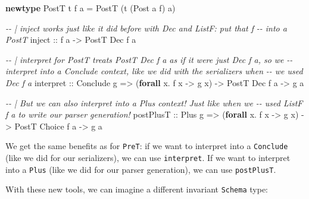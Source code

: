 \documentclass[]{article}
\newenvironment{Shaded}{}{}
\newcommand{\CommentTok}[1]{\textcolor[rgb]{0.38,0.63,0.69}{\textit{#1}}}
\newcommand{\DataTypeTok}[1]{\textcolor[rgb]{0.56,0.13,0.00}{#1}}
\newcommand{\KeywordTok}[1]{\textcolor[rgb]{0.00,0.44,0.13}{\textbf{#1}}}
\newcommand{\NormalTok}[1]{#1}
\newcommand{\OperatorTok}[1]{\textcolor[rgb]{0.40,0.40,0.40}{#1}}
\newcommand{\OtherTok}[1]{\textcolor[rgb]{0.00,0.44,0.13}{#1}}
\begin{document}
\begin{Shaded}
\begin{Highlighting}[]
\KeywordTok{newtype} \DataTypeTok{PostT}\NormalTok{ t f a }\OtherTok{=} \DataTypeTok{PostT}\NormalTok{ (t (}\DataTypeTok{Post}\NormalTok{ a f) a)}

\CommentTok{{-}{-} | \textasciigrave{}inject\textasciigrave{} works just like it did before with \textasciigrave{}Dec\textasciigrave{} and \textasciigrave{}ListF\textasciigrave{}: put that \textasciigrave{}f\textasciigrave{}}
\CommentTok{{-}{-} into a \textasciigrave{}PostT\textasciigrave{}}
\OtherTok{inject ::}\NormalTok{ f a }\OtherTok{{-}>} \DataTypeTok{PostT} \DataTypeTok{Dec}\NormalTok{ f a}

\CommentTok{{-}{-} | interpret for PostT treats \textasciigrave{}PostT Dec f a\textasciigrave{} as if it were just \textasciigrave{}Dec f a\textasciigrave{}, so we}
\CommentTok{{-}{-} interpret into a \textasciigrave{}Conclude\textasciigrave{} context, like we did with the serializers when}
\CommentTok{{-}{-} we used \textasciigrave{}Dec f a\textasciigrave{}}
\NormalTok{interpret}
\OtherTok{    ::} \DataTypeTok{Conclude}\NormalTok{ g}
    \OtherTok{=>}\NormalTok{ (}\KeywordTok{forall}\NormalTok{ x}\OperatorTok{.}\NormalTok{ f x }\OtherTok{{-}>}\NormalTok{ g x)}
    \OtherTok{{-}>} \DataTypeTok{PostT} \DataTypeTok{Dec}\NormalTok{ f a}
    \OtherTok{{-}>}\NormalTok{ g a}

\CommentTok{{-}{-} | But we can also interpret into a \textasciigrave{}Plus\textasciigrave{} context!  Just like when we}
\CommentTok{{-}{-} used \textasciigrave{}ListF f a\textasciigrave{} to write our parser generation!}
\NormalTok{postPlusT}
\OtherTok{    ::} \DataTypeTok{Plus}\NormalTok{ g}
    \OtherTok{=>}\NormalTok{ (}\KeywordTok{forall}\NormalTok{ x}\OperatorTok{.}\NormalTok{ f x }\OtherTok{{-}>}\NormalTok{ g x)}
    \OtherTok{{-}>} \DataTypeTok{PostT} \DataTypeTok{Choice}\NormalTok{ f a}
    \OtherTok{{-}>}\NormalTok{ g a}
\end{Highlighting}
\end{Shaded}

We get the same benefits as for \texttt{PreT}: if we want to interpret into a
\texttt{Conclude} (like we did for our serializers), we can use
\texttt{interpret}. If we want to interpret into a \texttt{Plus} (like we did
for our parser generation), we can use \texttt{postPlusT}.

With these new tools, we can imagine a different invariant \texttt{Schema} type:
\end{document}
